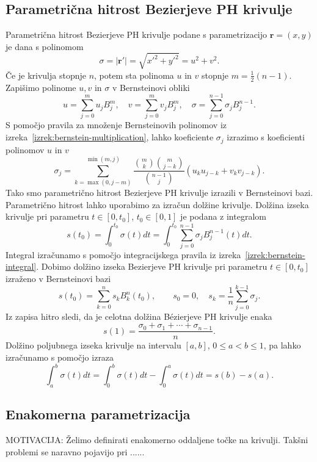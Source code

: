 \documentclass[isrm2, tisk]{fmfdelo}
\begin{document}
    \subsection{Parametrična hitrost Bezierjeve PH krivulje}
    Parametrična hitrost Bezierjeve PH krivulje podane s parametrizacijo $\mathbf{r}=(x,y)$ je dana s polinomom
    \[\sigma = |\mathbf{r}'| = \sqrt{x'^2+y'^2} = u^2+v^2.\]
    Če je krivulja stopnje $n$, potem sta polinoma $u$ in $v$ stopnje $m=\frac{1}{2}(n-1)$.
    Zapišimo polinome $u,v$ in $\sigma$ v Bernsteinovi obliki \[u=\sum_{j=0}^{m}u_j B_{j}^{m}, \quad v=\sum_{j=0}^{m}v_j B_{j}^{m}, \quad \sigma=\sum_{j=0}^{n-1}\sigma_j B_j^{n-1}.\]
    S pomočjo pravila za množenje Bernsteinovih polinomov iz izreka~\ref{izrek:bernstein-multiplication}, lahko koeficiente $\sigma_j$ izrazimo s koeficienti polinomov $u$ in $v$
    \[\sigma_j = \sum_{k=\max(0,j-m)}^{\min(m,j)} \frac{\binom{m}{k}\binom{m}{j-k}}{\binom{n-1}{j}}(u_k u_{j-k}+v_k v_{j-k}).\]
    Tako smo parametrično hitrost Bezierjeve PH krivulje izrazili v Bernsteinovi bazi.
    Parametrično hitrost lahko uporabimo za izračun dolžine krivulje.
    Dolžina izseka krivulje pri parametru $t \in [0,t_0]$, $t_0\in[0,1]$ je podana z integralom
    \[s(t_0)=\int_0^{t_0}\sigma(t)dt = \int_0^{t_0}\sum_{j=0}^{n-1}\sigma_j B_j^{n-1}(t)dt.\]
    Integral izračunamo s pomočjo integracijskega pravila iz izreka~\ref{izrek:bernstein-integral}.
    Dobimo dolžino izseka Bezierjeve PH krivulje pri parametru $t \in [0,t_0]$ izraženo v Bernsteinovi bazi
    \[s(t_0)=\sum_{k=0}^n s_k B_k^{n}(t_0),\qquad s_0=0,\quad s_k = \frac{1}{n}\sum^{k-1}_{j=0}\sigma_j.\]
    Iz zapisa hitro sledi, da je celotna dolžina Bézierjeve PH krivulje enaka \[s(1)=\frac{\sigma_0+\sigma_1+\cdots+\sigma_{n-1}}{n}.\]
    Dolžino poljubnega izseka krivulje na intervalu $[a,b]$, $0\leq a < b\leq1$, pa lahko izračunamo s pomočjo izraza
    \[\int_a^b \sigma(t)dt = \int_0^b\sigma(t)dt - \int_0^a\sigma(t)dt = s(b)-s(a).\]

    \subsection{Enakomerna parametrizacija}
    MOTIVACIJA: Želimo definirati enakomerno oddaljene točke na krivulji. Takšni problemi se naravno pojavijo pri ...... \newline
\end{document}

